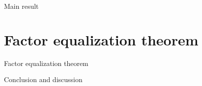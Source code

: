 \documentclass[notes,11pt, aspectratio=169, xcolor=table]{beamer}
\begin{document}
\begin{frame}{Main result}
    
\end{frame}

\section{Factor equalization theorem}

\begin{frame}{Factor equalization theorem}
    
\end{frame}

\begin{frame}{Conclusion and discussion}
    
\end{frame}
\end{document}
